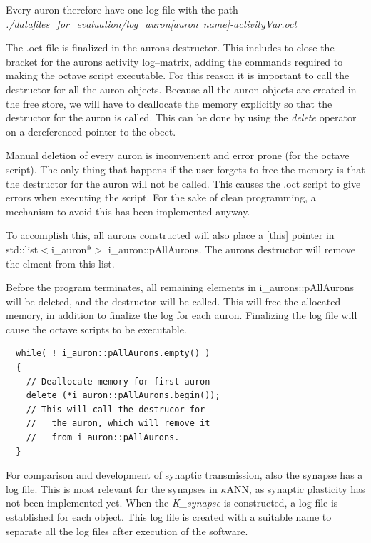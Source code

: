 Every auron therefore have one log file with the path \\ \mbox{\emph{./datafiles\_for\_evaluation/log\_auron[auron name]-activityVar.oct }}

The .oct file is finalized in the aurons destructor. This includes to close the bracket for the aurons activity log--matrix, adding the commands required to making the octave script executable.
For this reason it is important to call the destructor for all the auron objects. 
Because all the auron objects are created in the free store, we will have to deallocate the memory explicitly so that the destructor for the auron is called. 
This can be done by using the \emph{delete} operator on a dereferenced pointer to the obect.

Manual deletion of every auron is inconvenient and error prone (for the octave script). 
The only thing that happens if the user forgets to free the memory is that the destructor for the auron will not be called. 
This causes the .oct script to give errors when executing the script.
For the sake of clean programming, a mechanism to avoid this has been implemented anyway.

To accomplish this, 
all aurons constructed will also place a [this] pointer in std::list$<$i\_auron*$>$ i\_auron::pAllAurons.
The aurons destructor will remove the elment from this list.

Before the program terminates, all remaining elements in i\_aurons::pAllAurons will be deleted, and the destructor will be called.
This will free the allocated memory, in addition to finalize the log for each auron.
Finalizing the log file will cause the octave scripts to be executable.

\begin{lstlisting}
  while( ! i_auron::pAllAurons.empty() ) 
  { 
    // Deallocate memory for first auron
    delete (*i_auron::pAllAurons.begin()); 
    // This will call the destrucor for
    //   the auron, which will remove it
    //   from i_auron::pAllAurons.
  }   
\end{lstlisting}

For comparison and development of synaptic transmission, also the synapse has a log file. 
This is most relevant for the synapses in $\kappa$ANN, as synaptic plasticity has not been implemented yet.
When the \emph{K\_synapse} is constructed, a log file is established for each object. This log file is created with a suitable name to separate all the log files after execution of the software.

